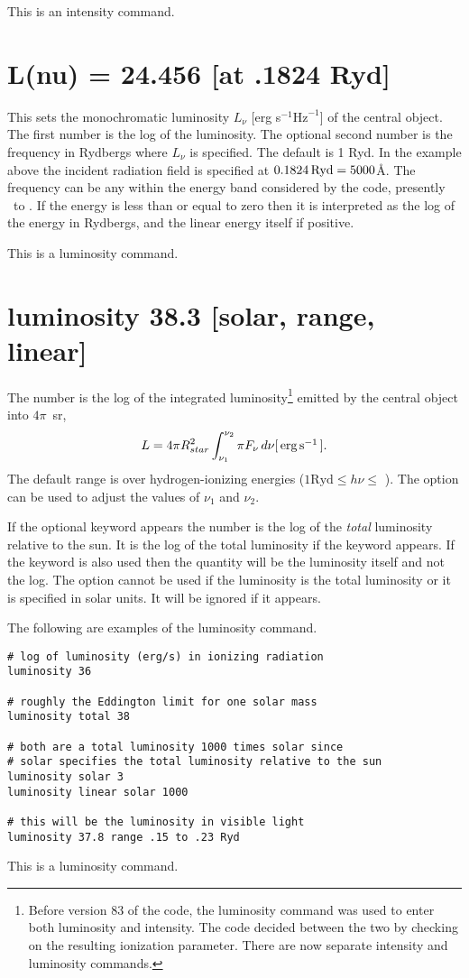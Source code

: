 This is an intensity command.

\section{L(nu) = 24.456 [at .1824 Ryd]}

This sets the monochromatic luminosity
$L_{\nu}$ [erg s$^{-1} \mathrm{Hz}^{-1}$] of the central object.
The first number is the log of the luminosity.
The optional
second number is the frequency in Rydbergs where $L_{\nu}$ is specified.  The default is 1 Ryd.
In the example above the incident radiation field is specified at
$0.1824 {\rm\thinspace Ryd} = 5000 $\AA.
The frequency can be any within the energy band considered
by the code, presently \emm\ to \egamry .  If the energy is
less than or equal to zero then it is interpreted as the log of the energy
in Rydbergs, and the linear energy itself if positive.

This is a luminosity command.
\label{sec:LuminosityCommand}

\section{luminosity 38.3 [solar, range, linear]}

The number is the log of the integrated luminosity\footnote{Before version 83 of the code, the luminosity command was used to
enter both luminosity and intensity.  The code decided between the two by
checking on the resulting ionization parameter.  There are now separate
intensity and luminosity commands.} emitted by the central
object into $4\pi$~sr,
\begin{equation}
L = 4 \pi R_{star}^2 \int_{\nu _1 }^{\nu _2 } {\pi F_\nu
\, d\nu } [\ergps ].%
\end{equation}
The default range is over hydrogen-ionizing energies ($1\mathrm{ Ryd} \le
h\nu\le$ \egamry ).  The  option can be used to adjust
the values of $\nu_1$ and $\nu_2$.

If the optional keyword  appears
the number is the log of the \emph{total} luminosity relative to the sun. 
It is the log of the total luminosity if the keyword  appears.
If the
 keyword is also used then the quantity will be the luminosity itself
and not the log.
The  option cannot be used if the luminosity is the
total luminosity or it is specified in solar units.
It will be ignored
if it appears.

The following are examples of the luminosity command.
\begin{verbatim}
# log of luminosity (erg/s) in ionizing radiation
luminosity 36

# roughly the Eddington limit for one solar mass
luminosity total 38

# both are a total luminosity 1000 times solar since
# solar specifies the total luminosity relative to the sun
luminosity solar 3
luminosity linear solar 1000

# this will be the luminosity in visible light
luminosity 37.8 range .15 to .23 Ryd
\end{verbatim}
This is a luminosity command.

